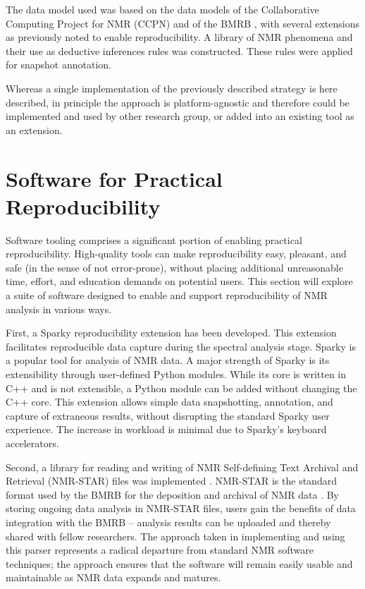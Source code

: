 The data model used was based on the data models of the 
Collaborative Computing Project for NMR (CCPN) \cite{ccpn}
and of the BMRB \cite{bmrb}, with several 
extensions as previously noted to enable reproducibility.  A library of NMR 
phenomena and their use as deductive inferences rules was constructed.  
These rules were applied for snapshot annotation.

Whereas a single implementation of the previously described strategy is 
here described, in principle the approach is platform-agnostic and 
therefore could be implemented and used by other research group, or added 
into an existing tool as an extension.


\section{Software for Practical Reproducibility}
Software tooling comprises a significant portion of enabling practical 
reproducibility.  High-quality tools can make reproducibility easy, pleasant, 
and safe (in the sense of not error-prone), without placing additional 
unreasonable time, effort, and education demands on potential users.  This 
section will explore a suite of software designed to enable and support 
reproducibility of NMR analysis in various ways.
	
First, a Sparky reproducibility extension has been developed.  This extension
facilitates reproducible data capture during the spectral analysis stage. Sparky 
\cite{sparky} is a popular tool for analysis of NMR data.  A major 
strength of Sparky is its extensibility through user-defined Python modules.  
While its core is written in C++ and is not extensible, a Python module can 
be added without changing the C++ core.  This extension allows
simple data snapshotting, annotation, and capture of extraneous results,
without disrupting the standard Sparky user experience.  The increase in
workload is minimal due to Sparky's keyboard accelerators.

Second, a library for reading and writing of 
NMR Self-defining Text Archival and Retrieval (NMR-STAR)
files was implemented \cite{fenwick2013}.  
NMR-STAR is the standard format used by the BMRB for the deposition and 
archival of NMR data \cite{hall1991star, hall1994star, hall1995star}.
By storing ongoing data analysis in NMR-STAR files, 
users gain the benefits of data integration with the BMRB -- analysis results 
can be uploaded and thereby shared with fellow researchers.  The approach 
taken in implementing and using this parser represents a radical departure 
from standard NMR software techniques; the approach ensures that the 
software will remain easily usable and maintainable as NMR data expands 
and matures.

